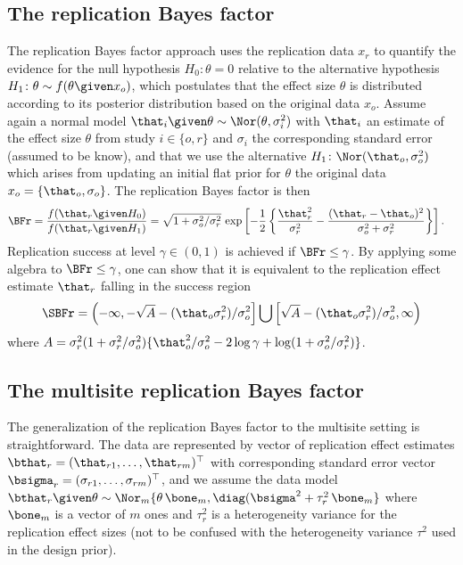 \begin{subappendices}
\subsection{The replication Bayes factor}
The replication Bayes factor approach uses the replication data $x_{r}$ to
quantify the evidence for the null hypothesis $H_{0}\colon \theta = 0$ relative
to the alternative hypothesis $H_{1} \colon \theta \sim f(\theta \given x_{o})$,
which postulates that the effect size $\theta$ is distributed according to its
posterior distribution based on the original data $x_{o}$. Assume again a normal
model $\that_{i} \given \theta \sim \Nor(\theta, \sigma^{2}_{i})$ with
$\that_{i}$ an estimate of the effect size $\theta$ from study $i \in \{o, r\}$
and $\sigma_{i}$ the corresponding standard error (assumed to be know), and that
we use the alternative $H_{1} \colon \Nor(\that_{o}, \sigma^{2}_{o})$ which
arises from updating an initial flat prior for $\theta$ the original data
$x_{o} = \{\that_{o}, \sigma_{o}\}$. The replication Bayes factor is then
\begin{align}
  \label{eq:bfr}
  \BFr &= \frac{f(\that_{r} \given H_{0})}{f(\that_{r} \given H_{1})}
       = \sqrt{1 + \sigma^{2}_{o}/\sigma^{2}_{r}} \, \exp\left[
         -\frac{1}{2}\left\{ \frac{\that^{2}_{r}}{\sigma^{2}_{r}} -
         \frac{(\that_{r} - \that_{o})^{2}}{\sigma^{2}_{o} + \sigma^{2}_{r}}
         \right\}\right].
\end{align}
Replication success at level $\gamma \in (0, 1)$ is achieved if
$\BFr \leq \gamma$. By applying some algebra to $\BFr \leq \gamma$, one can show
that it is equivalent to the replication effect estimate $\that_{r}$ falling in
the success region
\begin{align*}
  \SBFr
  = \left(-\infty, -\sqrt{A} - (\that_{o}\sigma^{2}_{r})/\sigma^{2}_{o}\right] \bigcup
   \left[\sqrt{A} - (\that_{o}\sigma^{2}_{r})/\sigma^{2}_{o}, \infty\right)
\end{align*}
where
$A = \sigma^{2}_{r}(1 + \sigma^{2}_{r}/\sigma^{2}_{o}) \{\that_{o}^{2}/\sigma^{2}_{o} - 2 \log \gamma + \log(1 + \sigma^{2}_{o}/\sigma^{2}_{r})\}$.

\subsection{The multisite replication Bayes factor}
The generalization of the replication Bayes factor to the multisite setting is
straightforward. The data are represented by vector of replication effect
estimates $\bthat_{r} = (\that_{r1}, \dots, \that_{rm})^{\top}$ with
corresponding standard error vector
$\bsigma_{r} = (\sigma_{r1}, \dots, \sigma_{rm})^{\top}$, and we assume the data
model
$\bthat_{r} \given \theta \sim \Nor_{m}\{\theta \, \bone_{m}, \diag(\bsigma^{2} + \tau^{2}_{r} \, \bone_{m}\}$
where $\bone_{m}$ is a vector of $m$ ones and $\tau^{2}_{r}$ is a heterogeneity
variance for the replication effect sizes (not to be confused with the
heterogeneity variance $\tau^{2}$ used in the design prior).


\end{subappendices}
